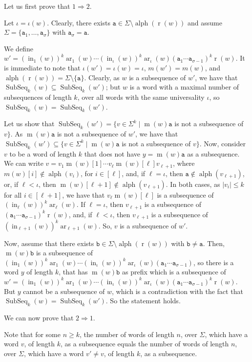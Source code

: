 \documentclass[10pt,a4paper]{amsart}
\makeatletter
\def\ta{\mathtt{a}}
\def\tb{\mathtt{b}}
\def\r{\operatorname{r}}
\def\m{\operatorname{m}}
\DeclareMathOperator{\ar}{ar}
\DeclareMathOperator{\al}{alph}
\DeclareMathOperator\ScatFact{SubSeq}
\DeclareMathOperator{\inner}{in}
\newif\ifpaper
\theoremstyle{plain}
\theoremstyle{definition}
\renewenvironment{proof}[1][\proofname]{\par
  \pushQED{}%
  \normalfont \topsep6\p@\@plus6\p@\relax
  \trivlist
  \item[\hskip\labelsep\itshape #1\@addpunct{.}]\ignorespaces
}{%
  \popQED\endtrivlist\@endpefalse
}
\makeatother
\begin{document}
\ifpaper
\else
\begin{proof}
Let us first prove that $1\Rightarrow 2$. 

Let $\iota=\iota(w)$. Clearly, there exists $\ta\in \Sigma\setminus \al(\r(w))$ and assume $\Sigma=\{\ta_1,\ldots,\ta_\sigma\}$ with $\ta_\sigma=\ta$. 

We define $w' = (\inner_1(w))^k\ar_1(w) \cdots (\inner_\iota(w))^k\ar_\iota(w) (\ta_1\cdots \ta_{\sigma-1})^k\r(w)$. It is immediate to note that $\iota(w')=\iota(w)=\iota$, $m(w')=m(w)$, and $\al(\r(w))=\Sigma\setminus \{\ta\}$. Clearly, as $w$ is a subsequence of $w'$, we have that $\ScatFact_k(w)\subseteq \ScatFact_k(w')$; but $w$ is a word with a maximal number of subsequences of length $k$, over all words with the same universality $\iota$, so $\ScatFact_k(w)= \ScatFact_k(w')$. 

Let us show that $\ScatFact_k(w')=\{v\in \Sigma^k\mid \m(w)\ta$ is not a subsequence of $v\}$. As $\m(w)\ta$ is not a subsequence of $w'$, we have that $\ScatFact_k(w')\subseteq \{v\in \Sigma^k\mid \m(w)\ta$ is not a subsequence of $v\}$. Now, consider $v$ to be a word of length $k$ that does not have $y=\m(w)\ta$ as a subsequence. We can write $v= v_1 \m(w)[1] \cdots v_\ell \m(w)[\ell] v_{\ell+1}$, where $m(w)[i] \notin \al(v_i)$, for $i\in [\ell]$, and, if $\ell=\iota$, then $\ta \notin \al(v_{\ell+1})$, or, if $\ell < \iota$, then $\m(w)[\ell+1] \notin \al(v_{\ell+1})$. In both cases, as $|v_i|\leq k$ for all $i\in [\ell+1]$, we have that $v_\ell \m(w)[\ell]$ is a subsequence of $(\inner_\ell(w))^k\ar_\ell(w)$. If $\ell=\iota$, then $v_{\ell+1}$ is a subsequence of $(\ta_1\cdots \ta_{\sigma-1})^k\r(w)$, and, if $\ell < \iota$, then $v_{\ell+1}$ is a subsequence of $(\inner_{\ell+1}(w))^k\ar_{\ell+1}(w)$. So, $v$ is a subsequence of $w'$. 

Now, assume that there exists $\tb\in \Sigma\setminus \al(\r(w))$ with $\tb\neq \ta$. Then, $\m(w)\tb$ is a subsequence of $(\inner_1(w))^k\ar_1(w) \cdots (\inner_\iota(w))^k\ar_\iota(w) (\ta_1\cdots \ta_{\sigma-1})$, so there is a word $y$ of length $k$, that has $\m(w)\tb$ as prefix which is a subsequence of $w' = (\inner_1(w))^k\ar_1(w) \cdots (\inner_\iota(w))^k\ar_\iota(w) (\ta_1\cdots \ta_{\sigma-1})^k\r(w)$. But $y$ cannot be a subsequence of $w$, which is a contradiction with the fact that $\ScatFact_k(w)= \ScatFact_k(w')$. So the statement holds. 

We can now prove that $2\Rightarrow 1$. 

Note that for some $n\geq k$, the number of words of length $n$, over $\Sigma$, which have a word $v$, of length $k$, as a subsequence equals the number of words of length $n$, over $\Sigma$, which have a word $v'\neq v$, of length $k$, as a subsequence. 


\end{proof}
\end{document}
